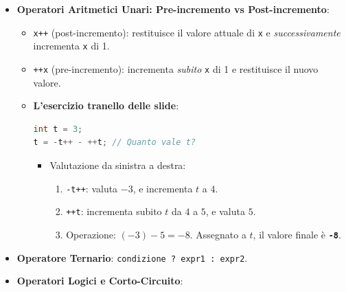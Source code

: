 \documentclass[11pt,a4paper,oneside]{report}
\newcommand{\passthrough}[1]{#1}
\providecommand{\tightlist}{\setlength{\itemsep}{0pt}\setlength{\parskip}{0pt}}
\begin{document}
\begin{itemize}
  \begin{itemize}
  \tightlist
  \item
    In Java le sotto-espressioni sono valutate \textbf{rigorosamente da
    sinistra a destra}:

    \begin{itemize}
    \tightlist
    \item
      \passthrough{\lstinline!int i = 1; int j = (i = 2) * i;!}
      \(\implies\) \passthrough{\lstinline!i!} diventa
      \passthrough{\lstinline!2!}, poi moltiplicato per
      \passthrough{\lstinline!i!} (\passthrough{\lstinline!2!})
      \(\implies\) \passthrough{\lstinline!j = 4!}.
    \item
      \passthrough{\lstinline!int t = 3; eval(t + (t = 2))!}
      \(\implies\) prima si valuta \passthrough{\lstinline!t!}
      (\passthrough{\lstinline!3!}), poi
      \passthrough{\lstinline!(t = 2)!} (\passthrough{\lstinline!2!})
      \(\implies 3 + 2 = 5\).
    \end{itemize}
  \end{itemize}
\item
  \textbf{Operatori Aritmetici Unari: Pre-incremento vs
  Post-incremento}:

  \begin{itemize}
  \item
    \passthrough{\lstinline!x++!} (post-incremento): restituisce il
    valore attuale di \passthrough{\lstinline!x!} e
    \emph{successivamente} incrementa \passthrough{\lstinline!x!} di 1.
  \item
    \passthrough{\lstinline!++x!} (pre-incremento): incrementa
    \emph{subito} \passthrough{\lstinline!x!} di 1 e restituisce il
    nuovo valore.
  \item
    \textbf{L'esercizio tranello delle slide}:

\begin{lstlisting}[language=Java]
int t = 3;
t = -t++ - ++t; // Quanto vale t?
\end{lstlisting}

    \begin{itemize}
    \tightlist
    \item
      Valutazione da sinistra a destra:

      \begin{enumerate}
      \def\labelenumi{\arabic{enumi}.}
      \tightlist
      \item
        \passthrough{\lstinline!-t++!}: valuta \(-3\), e incrementa
        \(t\) a \(4\).
      \item
        \passthrough{\lstinline!++t!}: incrementa subito \(t\) da \(4\)
        a \(5\), e valuta \(5\).
      \item
        Operazione: \((-3) - 5 = -8\). Assegnato a \(t\), il valore
        finale è \textbf{\passthrough{\lstinline!-8!}}.
      \end{enumerate}
    \end{itemize}
  \end{itemize}
\item
  \textbf{Operatore Ternario}:
  \passthrough{\lstinline!condizione ? expr1 : expr2!}.
\item
  \textbf{Operatori Logici e Corto-Circuito}:


\end{itemize}
\end{document}
